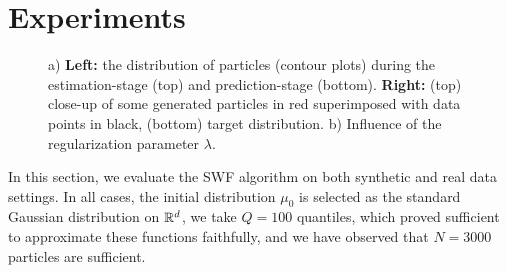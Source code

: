 
\section{Experiments}

\begin{figure}
 \hfill
{}
 \vspace{-\baselineskip}
\caption{a) \textbf{Left:} the distribution of particles (contour plots) during the estimation-stage (top) and prediction-stage (bottom). \textbf{Right:} (top) close-up of some generated particles in red superimposed with data points in black, (bottom) target distribution. b) Influence of the regularization parameter $\lambda$. }
\end{figure}

In this section, we evaluate the SWF algorithm on both synthetic and real data settings. In all cases, the initial distribution $\mu_0$ is selected as the standard Gaussian distribution on $\mathbb{R}^d$, we take $Q=100$ quantiles, which proved sufficient to approximate these functions faithfully, and we have observed that $N=3000$ particles are sufficient. 




